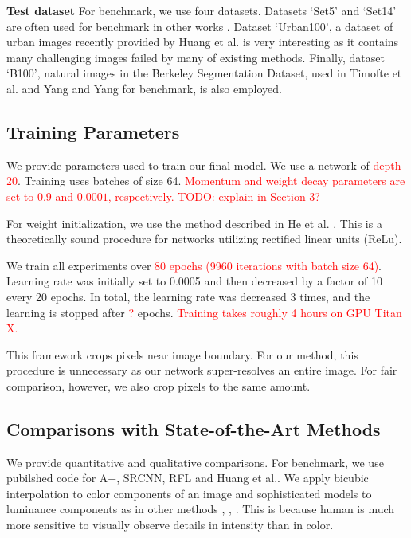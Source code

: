 \documentclass[10pt,twocolumn,letterpaper]{article}
\begin{document}
\textbf{Test dataset} For benchmark, we use four datasets. Datasets `Set5' \cite{bevilacqua2012} and `Set14' \cite{zeyde2012single} are often used for benchmark in other works \cite{Timofte,Timofte2013,Dong2014}. Dataset `Urban100', a dataset of urban images recently provided by Huang et al. \cite{Huang-CVPR-2015} is very interesting as it contains many challenging images failed by many of existing methods. Finally, dataset `B100', natural images in the Berkeley Segmentation Dataset, used in Timofte et al. \cite{Timofte} and Yang and Yang \cite{Yang2013} for benchmark, is also employed. 
\subsection{Training Parameters}
We provide parameters used to train our final model. We use a network of \textcolor{red}{depth 20}. Training uses batches of size 64. \textcolor{red}{Momentum and weight decay parameters are set to 0.9 and $0.0001$, respectively. TODO: explain in Section 3?}

For weight initialization, we use the method described in He et al. \cite{he2015delving}. This is a theoretically sound procedure for networks utilizing rectified linear units (ReLu).

We train all experiments over \textcolor{red}{80 epochs (9960 iterations with batch size 64)}. Learning rate was initially set to 0.0005 and then decreased by a factor of 10 every 20 epochs. In total, the learning rate was decreased 3 times, and the learning
is stopped after \textcolor{red}{?} epochs. \textcolor{red}{Training takes roughly 4 hours on GPU Titan X.} 



This framework crops pixels near image boundary. For our method, this procedure is unnecessary as our network super-resolves an entire image. For fair comparison, however, we also crop pixels to the same amount.

\subsection{Comparisons with State-of-the-Art Methods}
We provide quantitative and qualitative comparisons. For benchmark, we use pubilshed code for A+\cite{Timofte}, SRCNN\cite{dong2014image}, RFL\cite{schulter2015fast} and  Huang et al.\cite{Huang-CVPR-2015}. We apply bicubic interpolation to color components of an image and sophisticated models to luminance components as in  other methods \cite{chang2004super}, \cite{glasner2009super}, \cite{zeyde2012single}. This is because human is much more sensitive to visually observe details in intensity than in color. \footnotemark{}
\end{document}
